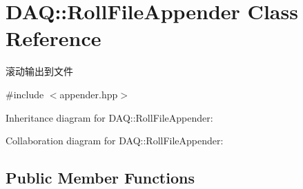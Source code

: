 \hypertarget{classDAQ_1_1RollFileAppender}{}\section{D\+AQ\+:\+:Roll\+File\+Appender Class Reference}
\label{classDAQ_1_1RollFileAppender}


滚动输出到文件  




{\ttfamily \#include $<$appender.\+hpp$>$}



Inheritance diagram for D\+AQ\+:\+:Roll\+File\+Appender\+:


Collaboration diagram for D\+AQ\+:\+:Roll\+File\+Appender\+:
\subsection*{Public Member Functions}

